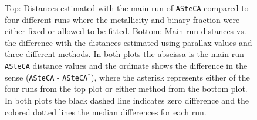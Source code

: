 \documentclass{aa}
\begin{document}
  \begin{figure}
   \caption{Top: Distances estimated with the main run of \texttt{ASteCA}
   compared to four different runs where the metallicity and binary fraction
   were either fixed or allowed to be fitted.
   Bottom: Main run distances vs. the difference with the distances
   estimated using parallax values and three different methods.
   In both plots the abscissa is the main run \texttt{ASteCA} distance values
   and the ordinate shows the difference in the sense (\texttt{ASteCA} - 
   \texttt{ASteCA}$^*$), where the asterisk represents either of the four runs
   from the top plot or either method from the bottom plot.
   In both plots the black dashed line indicates zero difference and the colored
   dotted lines  the median differences for each run.}
   \label{fig:dist_comparisions}
  \end{figure}
\end{document}
